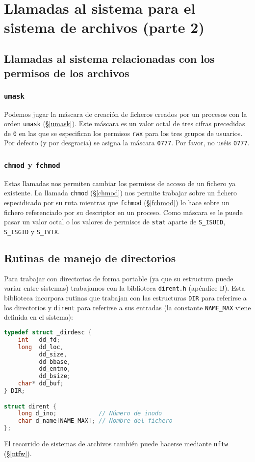 \section{Llamadas al sistema para el sistema de archivos (parte 2)}

\subsection{Llamadas al sistema relacionadas con los permisos de los archivos}

\subsubsection{\texttt{umask}}

Podemos jugar la máscara de creación de ficheros creados por un procesos con la orden \texttt{umask} (\S\ref{umask}).
Este máscara es un valor octal de tres cifras precedidas de \texttt{0} en las que se especifican los permisos \texttt{rwx} para los tres grupos de usuarios.
Por defecto (y por desgracia) se asigna la máscara \texttt{0777}.
Por favor, no uséis \texttt{0777}.

\subsubsection{\texttt{chmod} y \texttt{fchmod}}

Estas llamadas nos permiten cambiar los permisos de acceso de un fichero ya existente.
La llamada \texttt{chmod} (\S\ref{chmod}) nos permite trabajar sobre un fichero especidicado por su ruta mientras que \texttt{fchmod} (\S\ref{fchmod}) lo hace sobre un fichero referenciado por su descriptor en un proceso.
Como máscara se le puede pasar un valor octal o los valores de permisos de \texttt{stat} aparte de \texttt{S\_ISUID}, \texttt{S\_ISGID} y \texttt{S\_IVTX}.

\subsection{Rutinas de manejo de directorios}

Para trabajar con directorios de forma portable (ya que su estructura puede variar entre sistemas) trabajamos con la biblioteca \texttt{dirent.h} (apéndice B).
Esta biblioteca incorpora rutinas que trabajan con las estructuras \texttt{DIR} para referirse a los directorios y \texttt{dirent} para referirse a sus entradas (la constante \texttt{NAME\_MAX} viene definida en el sistema):

\begin{lstlisting}[language=C]
typedef struct _dirdesc {
	int   dd_fd;
	long  dd_loc,
	      dd_size,
	      dd_bbase,
	      dd_entno,
	      dd_bsize;
	char* dd_buf;
} DIR;

struct dirent {
	long d_ino;            // Número de inodo
	char d_name[NAME_MAX]; // Nombre del fichero
};
\end{lstlisting}

El recorrido de sistemas de archivos también puede hacerse mediante \texttt{nftw} (\S\ref{ntfw}).

